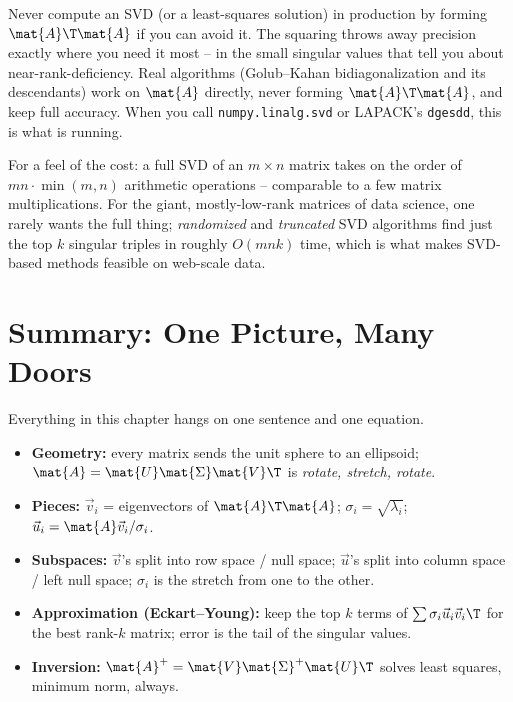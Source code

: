\begin{trapbox}
Never compute an SVD (or a least-squares solution) in production by forming
$\mat{A}\T\mat{A}$ if you can avoid it. The squaring throws away precision exactly
where you need it most -- in the small singular values that tell you about
near-rank-deficiency. Real algorithms (Golub--Kahan bidiagonalization and its
descendants) work on $\mat{A}$ directly, never forming $\mat{A}\T\mat{A}$, and
keep full accuracy. When you call \texttt{numpy.linalg.svd} or LAPACK's
\texttt{dgesdd}, this is what is running.
\end{trapbox}

For a feel of the cost: a full SVD of an $m\times n$ matrix takes on the order of
$mn\cdot\min(m,n)$ arithmetic operations -- comparable to a few matrix
multiplications. For the giant, mostly-low-rank matrices of data science, one
rarely wants the full thing; \emph{randomized} and \emph{truncated} SVD
algorithms find just the top $k$ singular triples in roughly $O(mnk)$ time, which
is what makes SVD-based methods feasible on web-scale data.

\section{Summary: One Picture, Many Doors}
\label{ch29:summary}

\begin{focusbox}
Everything in this chapter hangs on one sentence and one equation.
\begin{itemize}
  \item \textbf{Geometry:} every matrix sends the unit sphere to an ellipsoid;
        $\mat{A} = \mat{U}\mat{\Sigma}\mat{V}\T$ is \emph{rotate, stretch,
        rotate}.
  \item \textbf{Pieces:} $\vec{v}_i$ = eigenvectors of $\mat{A}\T\mat{A}$;
        $\sigma_i = \sqrt{\lambda_i}$; $\vec{u}_i = \mat{A}\vec{v}_i/\sigma_i$.
  \item \textbf{Subspaces:} $\vec{v}$'s split into row space / null space;
        $\vec{u}$'s split into column space / left null space; $\sigma_i$ is the
        stretch from one to the other.
  \item \textbf{Approximation (Eckart--Young):} keep the top $k$ terms of
        $\sum \sigma_i \vec{u}_i\vec{v}_i\T$ for the best rank-$k$ matrix; error
        is the tail of the singular values.
  \item \textbf{Inversion:} $\mat{A}^+ = \mat{V}\mat{\Sigma}^+\mat{U}\T$ solves
        least squares, minimum norm, always.
\end{itemize}
\end{focusbox}

